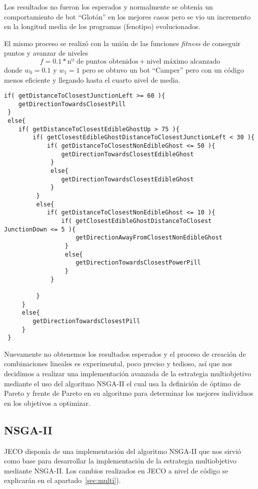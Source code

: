 Los resultados no fueron los esperados y normalmente se obtenía un comportamiento de bot ``Glotón'' en los mejores casos pero se vio un incremento en la longitud media de los programas (fenotipo) evolucionados.

El mismo proceso se realizó con la unión de las funciones \textit{fitness} de conseguir puntos y avanzar de niveles
\begin{equation*}
f = 0.1 * \textrm{nº de puntos obtenidos} + \textrm{nivel máximo alcanzado}
\end{equation*}
donde $w_0 = 0.1$ y $w_1 = 1$ pero se obtuvo un bot ``Camper'' pero con un código menos eficiente y llegando hasta el cuarto nivel de media.

\begin{lstlisting}[caption={Código del bot Camper obtenido mediante funciones agregativas.}]
if( getDistanceToClosestJunctionLeft >= 60 ){ 
    getDirectionTowardsClosestPill
 }
 else{ 
    if( getDistanceToClosestEdibleGhostUp > 75 ){ 
        if( getClosestEdibleGhostDistanceToClosestJunctionLeft < 30 ){ 
            if( getDistanceToClosestNonEdibleGhost <= 50 ){ 
                getDirectionTowardsClosestEdibleGhost
             }
             else{ 
                getDirectionTowardsClosestEdibleGhost
             }
         }
         else{ 
            if( getDistanceToClosestNonEdibleGhost <= 10 ){ 
                if( getClosestEdibleGhostDistanceToClosest JunctionDown <= 5 ){ 
                    getDirectionAwayFromClosestNonEdibleGhost
                 }
                 else{ 
                    getDirectionTowardsClosestPowerPill
                 }
             }
 
         }
     }
     else{ 
        getDirectionTowardsClosestPill
     }
 }
\end{lstlisting}

Nuevamente no obtenemos los resultados esperados y el proceso de creación de combinaciones lineales es experimental, poco preciso y tedioso, así que nos decidimos a realizar una implementación avanzada de la estrategia multiobjetivo mediante el uso del algoritmo NSGA-II el cual usa la definición de óptimo de Pareto y frente de Pareto en su algoritmo para determinar los mejores individuos en los objetivos a optimizar.

\subsection{NSGA-II}
JECO disponía de una implementación del algoritmo NSGA-II que nos sirvió como base para desarrollar la implementación de la estrategia multiobjetivo mediante NSGA-II. Los cambios realizados en JECO a nivel de código se explicarán en el apartado~\ref{sec:multi}).
 
